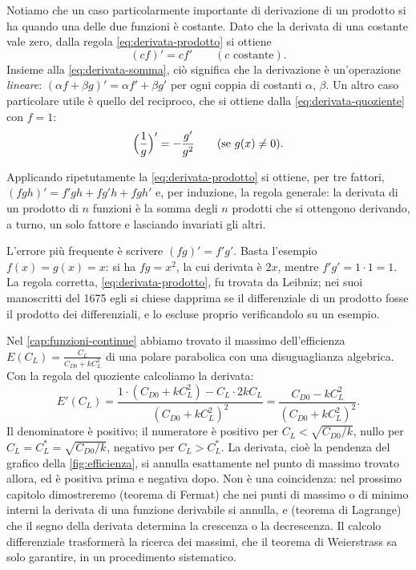 Notiamo che un caso particolarmente importante di derivazione di un prodotto si ha
quando una delle due funzioni è costante. Dato che la derivata di una costante vale zero,
dalla regola \eqref{eq:derivata-prodotto} si ottiene
\begin{equation}\label{eq:derivata-costante-per}
  (cf)'=cf' \qquad(c \text{ costante}).
\end{equation}
Insieme alla \eqref{eq:derivata-somma}, ciò significa che la derivazione è
un'operazione \emph{lineare}: $(\alpha f+\beta g)'=\alpha f'+\beta g'$ per ogni coppia di
costanti $\alpha$, $\beta$. Un altro caso particolare utile è quello del reciproco, che si
ottiene dalla \eqref{eq:derivata-quoziente} con $f=1$:
\begin{equation}\label{eq:derivata-reciproco}
  \Bigl(\frac1g\Bigr)'=-\frac{g'}{g^{2}} \qquad(\text{se } g(x)\neq0).
\end{equation}

\begin{osservazione}\label{oss:prodotto-n}
Applicando ripetutamente la \eqref{eq:derivata-prodotto} si ottiene, per tre fattori,
$(fgh)'=f'gh+fg'h+fgh'$ e, per induzione, la regola generale: la derivata di un prodotto
di $n$ funzioni è la somma degli $n$ prodotti che si ottengono derivando, a turno, un
solo fattore e lasciando invariati gli altri.
\end{osservazione}

\begin{attenzione}
L'errore più frequente è scrivere $(fg)'=f'g'$. Basta l'esempio $f(x)=g(x)=x$: si ha
$fg=x^{2}$, la cui derivata è $2x$, mentre $f'g'=1\cdot1=1$. La regola corretta,
\eqref{eq:derivata-prodotto}, fu trovata da Leibniz; nei suoi manoscritti del 1675 egli
si chiese dapprima se il differenziale di un prodotto fosse il prodotto dei
differenziali, e lo escluse proprio verificandolo su un esempio.
\end{attenzione}

\begin{idea}
Nel \cref{cap:funzioni-continue} abbiamo trovato il massimo dell'efficienza
$E(C_{L})=\frac{C_{L}}{C_{D0}+kC_{L}^{2}}$ di una polare parabolica con una disuguaglianza
algebrica. Con la regola del quoziente calcoliamo la derivata:
\[
  E'(C_{L})=\frac{1\cdot(C_{D0}+kC_{L}^{2})-C_{L}\cdot2kC_{L}}{(C_{D0}+kC_{L}^{2})^{2}}
  =\frac{C_{D0}-kC_{L}^{2}}{(C_{D0}+kC_{L}^{2})^{2}} .
\]
Il denominatore è positivo; il numeratore è positivo per $C_{L}<\sqrt{C_{D0}/k}$, nullo
per $C_{L}=C_{L}^{*}=\sqrt{C_{D0}/k}$, negativo per $C_{L}>C_{L}^{*}$. La derivata, cioè la
pendenza del grafico della \cref{fig:efficienza}, si annulla esattamente nel punto di
massimo trovato allora, ed è positiva prima e negativa dopo. Non è una coincidenza: nel
prossimo capitolo dimostreremo (teorema di Fermat) che nei punti di massimo o di minimo
interni la derivata di una funzione derivabile si annulla, e (teorema di Lagrange) che il
segno della derivata determina la crescenza o la decrescenza. Il calcolo differenziale
trasformerà la ricerca dei massimi, che il teorema di Weierstrass sa solo garantire,
in un procedimento sistematico.
\end{idea}

